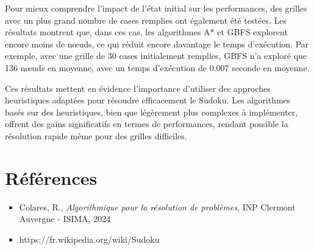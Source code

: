 \documentclass{article}
\begin{document}
Pour mieux comprendre l'impact de l'état initial sur les performances, des grilles avec un plus grand nombre de cases remplies ont également été testées. Les résultats montrent que, dans ces cas, les algorithmes A* et GBFS explorent encore moins de nœuds, ce qui réduit encore davantage le temps d'exécution. Par exemple, avec une grille de 30 cases initialement remplies, GBFS n'a exploré que 136 nœuds en moyenne, avec un temps d'exécution de 0.007 seconde en moyenne.

Ces résultats mettent en évidence l'importance d'utiliser des approches heuristiques adaptées pour résoudre efficacement le Sudoku. Les algorithmes basés sur des heuristiques, bien que légèrement plus complexes à implémenter, offrent des gains significatifs en termes de performances, rendant possible la résolution rapide même pour des grilles difficiles.


\section{Références}
\begin{itemize}
    \item Colares, R., \textit{Algorithmique pour la résolution de problèmes}, INP Clermont Auvergne - ISIMA, 2024
    \item https://fr.wikipedia.org/wiki/Sudoku
\end{itemize}
\end{document}
